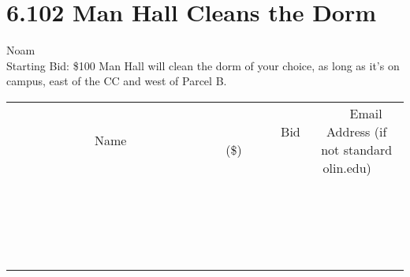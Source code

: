 \documentclass[11pt]{article}
\begin{document}
\section*{6.102 Man Hall Cleans the Dorm}
Noam
\\
Starting Bid: \$100
\newline
Man Hall will clean the dorm of your choice, as long as it's on campus,  east of the CC and west of Parcel B.
\\[3ex]
\begin{tabular}{c c c}
~~~~~~~~~~~~~Name~~~~~~~~~~~~~ & ~~~~~~~~~Bid (\$)~~~~~~~~~  & ~~~Email Address (if not standard olin.edu)~~~\\
 & & \\
\hline
 & & \\
\hline
 & & \\
\hline
 & & \\
\hline
 & & \\
\hline
 & & \\
\hline
 & & \\
\hline
 & & \\
\hline
 & & \\
\hline
 & & \\
\hline
 & & \\
\hline
 & & \\
\hline
 & & \\
\hline
 & & \\
\hline
 & & \\
\hline
 & & \\
\hline
 & & \\
\hline
 & & \\
\hline
 & & \\
\hline
\end{tabular}
\newpage
\end{document}
